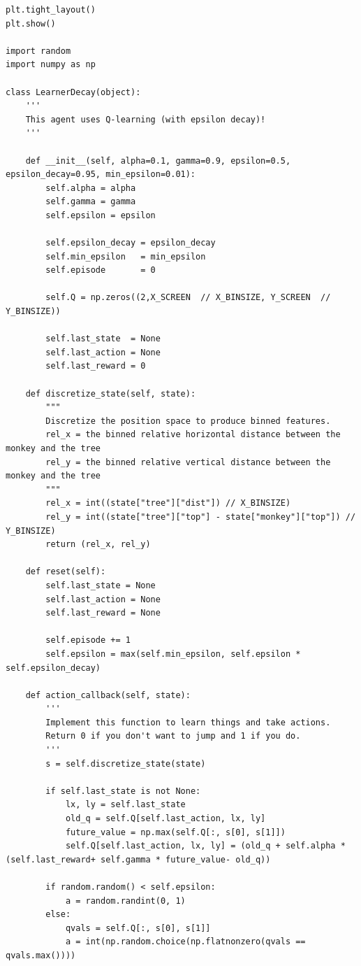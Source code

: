 \documentclass[submit]{../harvardml}
\begin{document}
\begin{lstlisting}
plt.tight_layout()
plt.show()

import random
import numpy as np

class LearnerDecay(object):
    '''
    This agent uses Q-learning (with epsilon decay)!
    '''

    def __init__(self, alpha=0.1, gamma=0.9, epsilon=0.5, epsilon_decay=0.95, min_epsilon=0.01):
        self.alpha = alpha
        self.gamma = gamma
        self.epsilon = epsilon

        self.epsilon_decay = epsilon_decay
        self.min_epsilon   = min_epsilon
        self.episode       = 0

        self.Q = np.zeros((2,X_SCREEN  // X_BINSIZE, Y_SCREEN  // Y_BINSIZE))

        self.last_state  = None
        self.last_action = None
        self.last_reward = 0
        
    def discretize_state(self, state):
        """
        Discretize the position space to produce binned features.
        rel_x = the binned relative horizontal distance between the monkey and the tree
        rel_y = the binned relative vertical distance between the monkey and the tree
        """
        rel_x = int((state["tree"]["dist"]) // X_BINSIZE)
        rel_y = int((state["tree"]["top"] - state["monkey"]["top"]) // Y_BINSIZE)
        return (rel_x, rel_y)
    
    def reset(self):
        self.last_state = None
        self.last_action = None
        self.last_reward = None
        
        self.episode += 1
        self.epsilon = max(self.min_epsilon, self.epsilon * self.epsilon_decay)

    def action_callback(self, state):
        '''
        Implement this function to learn things and take actions.
        Return 0 if you don't want to jump and 1 if you do.
        '''
        s = self.discretize_state(state)

        if self.last_state is not None:
            lx, ly = self.last_state
            old_q = self.Q[self.last_action, lx, ly]
            future_value = np.max(self.Q[:, s[0], s[1]])
            self.Q[self.last_action, lx, ly] = (old_q + self.alpha * (self.last_reward+ self.gamma * future_value- old_q))

        if random.random() < self.epsilon:
            a = random.randint(0, 1)
        else:
            qvals = self.Q[:, s[0], s[1]]
            a = int(np.random.choice(np.flatnonzero(qvals == qvals.max())))


\end{lstlisting}
\end{document}
